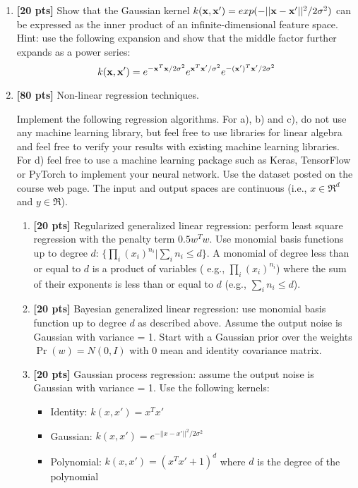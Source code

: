 \documentclass{article}
\begin{document}
\begin{enumerate}


\item {\bf [20 pts]} Show that the Gaussian kernel $k({\bf x},{\bf x}') =
  exp(-||{\bf x}-{\bf x}'||^2/2\sigma^2)$ can be expressed as the inner product of
  an infinite-dimensional feature space.  Hint: use the following
  expansion and show that the middle factor further expands as a power
  series: $$k({\bf x},{\bf x}') = e^{-{\bf x}^T{\bf x}/2\sigma^2}e^{{\bf x}^T{\bf x}'/\sigma^2}e^{-({\bf x}')^T{\bf x}'/2\sigma^2}$$




\item {\bf [80 pts]} Non-linear regression techniques.  

Implement the following regression algorithms.  For a), b) and c), do not use any machine learning library, but feel free to
use libraries for linear algebra and feel free to verify your results with existing machine learning libraries. For d) feel free to use a machine learning package such as Keras, TensorFlow or PyTorch to implement your neural network. Use the dataset
posted on the course web page.  The input and output spaces are
continuous (i.e., $x \in \Re^d$ and $y \in \Re$).

  \begin{enumerate}
  \item {\bf [20 pts]} Regularized generalized linear regression: perform least square regression with the penalty term $0.5 w^T w$. Use monomial basis functions up to degree $d$: $\{\prod_i (x_i)^{n_i} | \sum_i n_i \le d\}$.  A monomial of degree less than or equal to $d$ is a product of variables ( e.g., $\prod_i (x_i)^{n_i}$) where the sum of their exponents is less than or equal to $d$ (e.g., $\sum_i n_i \le d$).

  \item {\bf [20 pts]} Bayesian generalized linear regression: use monomial basis function up to degree $d$ as described above.  Assume the output noise is Gaussian with variance = 1.  Start with a Gaussian prior over the weights $\Pr(w)=N(0,I)$ with 0 mean and identity covariance matrix. 

  \item {\bf [20 pts]} Gaussian process regression: assume the output noise is Gaussian with variance = 1.  Use the following kernels:
\begin{itemize}
\item Identity: $k(x,x') = x^Tx'$
\item Gaussian: $k(x,x') = e^{-||x-x'||^2/2\sigma^2}$
\item Polynomial: $k(x,x') = (x^Tx'+1)^d$ where $d$ is the degree of the polynomial
\end{itemize}


\end{enumerate}
\end{enumerate}
\end{document}
